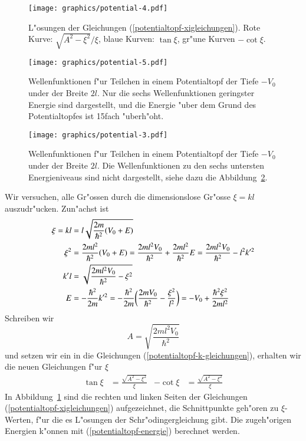 \begin{figure}
\centering
\texttt{[image: graphics/potential-4.pdf]}
\caption{L"osungen der Gleichungen (\ref{potentialtopf-xigleichungen}).
Rote Kurve: $\sqrt{A^2-\xi^2}/\xi$, blaue Kurven: $\tan\xi$, gr"une
Kurven $-\cot\xi$.
\label{loesungen-xigleichungen}}
\end{figure}%
\begin{figure}
\centering
\texttt{[image: graphics/potential-5.pdf]}
\caption{Wellenfunktionen f"ur Teilchen in einem Potentialtopf der
Tiefe $-V_0$ under der Breite $2l$. Nur die sechs Wellenfunktionen 
geringster Energie sind dargestellt, und die Energie "uber dem
Grund des Potentialtopfes ist 15fach "uberh"oht.
\label{potentialtopf-loesungen-klein}}
\end{figure}
\begin{figure}
\centering
\texttt{[image: graphics/potential-3.pdf]}
\caption{Wellenfunktionen f"ur Teilchen in einem Potentialtopf der
Tiefe $-V_0$ under der Breite $2l$. Die Wellenfunktionen zu den sechs
untersten Energieniveaus sind nicht dargestellt, siehe dazu die
Abbildung~\ref{potentialtopf-loesungen-klein}.
\label{potentialtopf-loesungen}}
\end{figure}
Wir versuchen, alle Gr"ossen durch die dimensionslose Gr"osse $\xi=kl$
auszudr"ucken.
Zun"achst ist
\begin{align}
\xi=kl&=l\sqrt{\frac{2m}{\hbar^2}(V_0+E)}
\notag
\\
\xi^2
&=
\frac{2ml^2}{\hbar^2}(V_0+E)
=
\frac{2ml^2V_0}{\hbar^2} +\frac{2ml^2}{\hbar^2}E
=
\frac{2ml^2V_0}{\hbar^2}-l^2k'^2
\notag
\\
k'l
&=
\sqrt{\frac{2ml^2V_0}{\hbar^2} - \xi^2}
\notag
\\
E
&=
-\frac{\hbar^2}{2m}k'^2
=
-\frac{\hbar^2}{2m}
\biggl(
\frac{2mV_0}{\hbar^2} - \frac{\xi^2}{l^2}
\biggr)
=
-V_0+\frac{\hbar^2\xi^2}{2ml^2}
\label{potentialtopf-energie}
\end{align}
Schreiben wir
\[
A=\sqrt{\frac{2ml^2V_0}{\hbar^2}}
\]
und setzen wir ein in die Gleichungen (\ref{potentialtopf-k-gleichungen}),
erhalten wir die neuen Gleichungen f"ur $\xi$
\begin{align}
\tan \xi&=\frac{\sqrt{A^2-\xi^2}}{\xi}
&
-\cot \xi&=\frac{\sqrt{A^2-\xi^2}}{\xi}
\label{potentialtopf-xigleichungen}
\end{align}
In Abbildung~\ref{loesungen-xigleichungen} sind die rechten und linken
Seiten der Gleichungen (\ref{potentialtopf-xigleichungen}) aufgezeichnet,
die Schnittpunkte geh"oren zu $\xi$-Werten, f"ur die es L"osungen
der Schr"odingergleichung gibt.
Die zugeh"origen Energien k"onnen mit (\ref{potentialtopf-energie})
berechnet werden.


